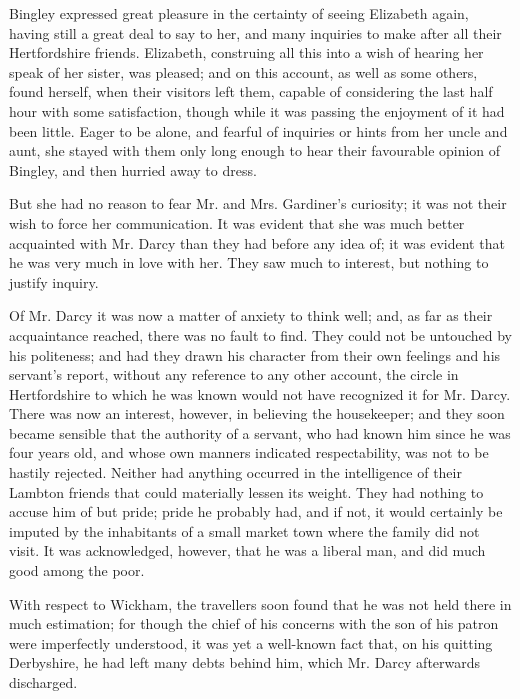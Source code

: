 \documentclass[12pt,openright]{book}
\begin{document}
Bingley expressed great pleasure in the certainty of seeing Elizabeth again, having still a great deal to say to her, and many inquiries to make after all their Hertfordshire friends. Elizabeth, construing all this into a wish of hearing her speak of her sister, was pleased; and on this account, as well as some others, found herself, when their visitors left them, capable of considering the last half hour with some satisfaction, though while it was passing the enjoyment of it had been little. Eager to be alone, and fearful of inquiries or hints from her uncle and aunt, she stayed with them only long enough to hear their favourable opinion of Bingley, and then hurried away to dress.

But she had no reason to fear Mr. and Mrs. Gardiner’s curiosity; it was not their wish to force her communication. It was evident that she was much better acquainted with Mr. Darcy than they had before any idea of; it was evident that he was very much in love with her. They saw much to interest, but nothing to justify inquiry.

Of Mr. Darcy it was now a matter of anxiety to think well; and, as far as their acquaintance reached, there was no fault to find. They could not be untouched by his politeness; and had they drawn his character from their own feelings and his servant’s report, without any reference to any other account, the circle in Hertfordshire to which he was known would not have recognized it for Mr. Darcy. There was now an interest, however, in believing the housekeeper; and they soon became sensible that the authority of a servant, who had known him since he was four years old, and whose own manners indicated respectability, was not to be hastily rejected. Neither had anything occurred in the intelligence of their Lambton friends that could materially lessen its weight. They had nothing to accuse him of but pride; pride he probably had, and if not, it would certainly be imputed by the inhabitants of a small market town where the family did not visit. It was acknowledged, however, that he was a liberal man, and did much good among the poor.

With respect to Wickham, the travellers soon found that he was not held there in much estimation; for though the chief of his concerns with the son of his patron were imperfectly understood, it was yet a well-known fact that, on his quitting Derbyshire, he had left many debts behind him, which Mr. Darcy afterwards discharged.
\end{document}
